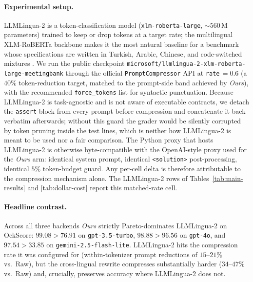 \documentclass[11pt,a4paper,twocolumn]{article}
\begin{document}
\paragraph{Experimental setup.} LLMLingua-2 is a token-classification model (\texttt{xlm-roberta-large}, $\sim\!560$\,M parameters) trained to keep or drop tokens at a target rate; the multilingual XLM-RoBERTa backbone makes it the most natural baseline for a benchmark whose specifications are written in Turkish, Arabic, Chinese, and code-switched mixtures \cite{pan2024llmlingua2}. We run the public checkpoint \texttt{microsoft/llmlingua-2-xlm-roberta-large-meetingbank} through the official \texttt{PromptCompressor} API at \texttt{rate}\,$=0.6$ (a $40\%$ token-reduction target, matched to the prompt-side band achieved by \textit{Ours}), with the recommended \texttt{force\_tokens} list for syntactic punctuation. Because LLMLingua-2 is task-agnostic and is not aware of executable contracts, we detach the \texttt{assert} block from every prompt before compression and concatenate it back verbatim afterwards; without this guard the grader would be silently corrupted by token pruning inside the test lines, which is neither how LLMLingua-2 is meant to be used nor a fair comparison. The Python proxy that hosts LLMLingua-2 is otherwise byte-compatible with the OpenAI-style proxy used for the \textit{Ours} arm: identical system prompt, identical \texttt{<solution>} post-processing, identical $5\%$ token-budget guard. Any per-cell delta is therefore attributable to the compression mechanism alone. The LLMLingua-2 rows of Tables~\ref{tab:main-results} and \ref{tab:dollar-cost} report this matched-rate cell.

\paragraph{Headline contrast.} Across all three backends \textit{Ours} strictly Pareto-dominates LLMLingua-2 on OckScore: $99.08 > 76.91$ on \texttt{gpt-3.5-turbo}, $98.88 > 96.56$ on \texttt{gpt-4o}, and $97.54 > 33.85$ on \texttt{gemini-2.5-flash-lite}. LLMLingua-2 hits the compression rate it was configured for (within-tokenizer prompt reductions of $15$--$21\%$ vs.\ Raw), but the cross-lingual rewrite compresses substantially harder ($34$--$47\%$ vs.\ Raw) and, crucially, preserves accuracy where LLMLingua-2 does not.
\end{document}
